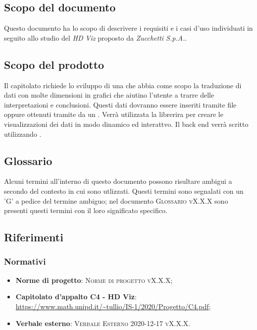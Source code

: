 \documentclass[../analisi-dei-requisiti.tex]{subfiles}
\begin{document}
\subsection{Scopo del documento}%
\label{subs:scopo_del_documento}
Questo documento ha lo scopo di descrivere i requisiti e i casi d'uso individuati in seguito allo studio del  \emph{HD Viz} proposto da \emph{Zucchetti S.p.A.}. 

\subsection{Scopo del prodotto}%
\label{subs:scopo_del_prodotto}
Il capitolato richiede lo sviluppo di una  che abbia come scopo la 
traduzione di dati con molte dimensioni in grafici che aiutino l’utente a trarre delle interpretazioni e conclusioni. Questi dati dovranno essere inseriti tramite file  oppure ottenuti tramite  da un .
Verrà utilizzata la librerira   per creare le visualizzazioni dei dati in modo dinamico ed interattvo.
Il back end verrà scritto utilizzando . 


\subsection{Glossario}
\label{subs:glossario}
Alcuni termini all'interno di questo documento possono risultare ambigui a secondo del contesto in cui sono utlizzati.
Questi termini sono segnalati con un 'G' a pedice del termine ambiguo; nel documento \textsc{Glossario vX.X.X} sono presenti questi termini con il loro significato specifico.


\subsection{Riferimenti}
\label{subs:riferimenti}

\subsubsection{Normativi}%
\label{sssec:normativi}

\begin{itemize}
  \item \textbf{Norme di progetto}: \textsc{Norme di progetto vX.X.X};
  \item \textbf{Capitolato d'appalto C4 - HD Viz}: \url{https://www.math.unipd.it/~tullio/IS-1/2020/Progetto/C4.pdf};
  \item \textbf{Verbale esterno}: \textsc{Verbale Esterno 2020-12-17 vX.X.X}.
\end{itemize}
\end{document}
